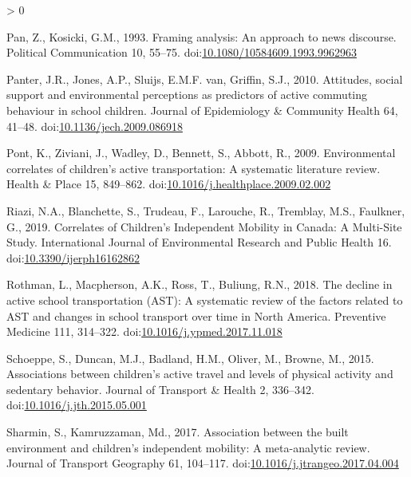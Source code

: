 \documentclass[]{elsarticle} %
\newlength{\cslhangindent}
\newenvironment{CSLReferences}[2] %
 {%
  \setlength{\parindent}{0pt}
  \ifodd #1 \everypar{\setlength{\hangindent}{\cslhangindent}}\ignorespaces\fi
  \ifnum #2 > 0
  \setlength{\parskip}{#2\baselineskip}
  \fi
 }%
 {}
\begin{document}
\begin{CSLReferences}{1}{0}
\leavevmode\hypertarget{ref-panFramingAnalysisApproach1993}{}%
Pan, Z., Kosicki, G.M., 1993. Framing analysis: An approach to news
discourse. Political Communication 10, 55--75.
doi:\href{https://doi.org/10.1080/10584609.1993.9962963}{10.1080/10584609.1993.9962963}

\leavevmode\hypertarget{ref-panterAttitudesSocialSupport2010}{}%
Panter, J.R., Jones, A.P., Sluijs, E.M.F. van, Griffin, S.J., 2010.
Attitudes, social support and environmental perceptions as predictors of
active commuting behaviour in school children. Journal of Epidemiology
\& Community Health 64, 41--48.
doi:\href{https://doi.org/10.1136/jech.2009.086918}{10.1136/jech.2009.086918}

\leavevmode\hypertarget{ref-pontEnvironmentalCorrelatesChildren2009}{}%
Pont, K., Ziviani, J., Wadley, D., Bennett, S., Abbott, R., 2009.
Environmental correlates of children's active transportation: A
systematic literature review. Health \& Place 15, 849--862.
doi:\href{https://doi.org/10.1016/j.healthplace.2009.02.002}{10.1016/j.healthplace.2009.02.002}

\leavevmode\hypertarget{ref-riaziCorrelatesChildrenIndependent2019}{}%
Riazi, N.A., Blanchette, S., Trudeau, F., Larouche, R., Tremblay, M.S.,
Faulkner, G., 2019. Correlates of {Children}'s {Independent Mobility} in
{Canada}: A {Multi}-{Site Study}. International Journal of Environmental
Research and Public Health 16.
doi:\href{https://doi.org/10.3390/ijerph16162862}{10.3390/ijerph16162862}

\leavevmode\hypertarget{ref-rothmanDeclineActiveSchool2018a}{}%
Rothman, L., Macpherson, A.K., Ross, T., Buliung, R.N., 2018. The
decline in active school transportation ({AST}): A systematic review of
the factors related to {AST} and changes in school transport over time
in {North America}. Preventive Medicine 111, 314--322.
doi:\href{https://doi.org/10.1016/j.ypmed.2017.11.018}{10.1016/j.ypmed.2017.11.018}

\leavevmode\hypertarget{ref-schoeppeAssociationsChildrenActive2015}{}%
Schoeppe, S., Duncan, M.J., Badland, H.M., Oliver, M., Browne, M., 2015.
Associations between children's active travel and levels of physical
activity and sedentary behavior. Journal of Transport \& Health 2,
336--342.
doi:\href{https://doi.org/10.1016/j.jth.2015.05.001}{10.1016/j.jth.2015.05.001}

\leavevmode\hypertarget{ref-sharminAssociationBuiltEnvironment2017}{}%
Sharmin, S., Kamruzzaman, Md., 2017. Association between the built
environment and children's independent mobility: A meta-analytic review.
Journal of Transport Geography 61, 104--117.
doi:\href{https://doi.org/10.1016/j.jtrangeo.2017.04.004}{10.1016/j.jtrangeo.2017.04.004}


\end{CSLReferences}
\end{document}
